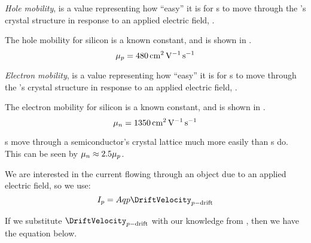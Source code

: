 \begin{definition}\label{def:Hole_Mobility}
  \emph{Hole mobility}, \HoleMobility{} is a value representing how ``easy'' it is for s to move through the 's crystal structure in response to an applied electric field, \EField{}.

  The hole mobility for  silicon is a known constant, and is shown in .
  \begin{equation}\label{eq:Hole_Mobility-Intrinsic_Silicon}
    \mu_{p} = \SI{480}{\centi\meter\squared\per\volt\per\second}
  \end{equation}
\end{definition}

\begin{definition}\label{def:Electron_Mobility}
  \emph{Electron mobility}, \ElectronMobility{} is a value representing how ``easy'' it is for s to move through the 's crystal structure in response to an applied electric field, \EField{}.

  The electron mobility for  silicon is a known constant, and is shown in .
  \begin{equation}\label{eq:Electron_Mobility-Intrinsic_Silicon}
    \mu_{n} = \SI{1350}{\centi\meter\squared\per\volt\per\second}
  \end{equation}

  \begin{remark}
    s move through a semiconductor's crystal lattice much more easily than s do.
    This can be seen by $\mu_{n} \approx 2.5 \mu_{p}$.
  \end{remark}
\end{definition}

We are interested in the current flowing through an object due to an applied electric field, so we use:
\begin{equation}\label{eq:Drift_Current-Hole}
  \DCCurrent{\HoleConcentration} = \Area \eCharge \HoleConcentration \DriftVelocity_{\HoleConcentration-\text{drift}}
\end{equation}

If we substitute $\DriftVelocity_{\HoleConcentration-\text{drift}}$ with our knowledge from , then we have the equation below.

